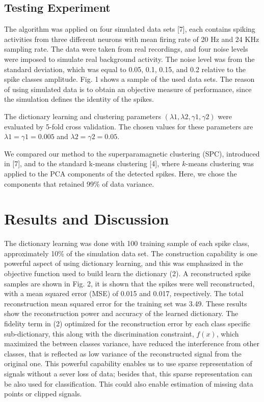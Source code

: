 \documentclass[conference]{IEEEtran}
\begin{document}
	\subsection{Testing Experiment}
	The algorithm was applied on four simulated data sets [7], each contains spiking activities from three different neurons with mean firing rate of 20 Hz and 24 KHz sampling rate. The data were taken from real recordings, and four noise levels were imposed to simulate real background activity. The noise level was from the standard deviation, which was equal to 0.05, 0.1, 0.15, and 0.2 relative to the spike classes amplitude. Fig. 1 shows a sample of the used data sets. The reason of using simulated data is to obtain an objective measure of performance, since the simulation defines the identity of the spikes.
	
	The dictionary learning and clustering parameters
	$(\lambda1, \lambda2, \gamma1, \gamma2)$ were evaluated by 5-fold cross validation. The chosen values for these parameters are $\lambda1 = \gamma1 = 0.005$ and $\lambda2 = \gamma2 = 0.05$.
	
	We compared our method to the superparamagnetic clustering (SPC), introduced in [7], and to the standard k-means clustering [4], where $k$-means clustering was applied to the PCA components of the detected spikes. Here, we chose the components that retained 99\% of data variance.
	
 	\section{Results and Discussion}
	The dictionary learning was done with 100 training sample of each spike class, approximately 10\% of the simulation data set. The construction capability is one powerful aspect of using dictionary learning, and this was emphasized in the objective function used to build learn the dictionary (2). A reconstructed spike samples are shown in Fig. 2, it is shown that the spikes were well reconstructed, with a mean squared error (MSE) of 0.015 and 0.017, respectively. The total reconstruction mean squared error for the training set was 3.49. These results show the reconstruction power and accuracy of the learned dictionary. The fidelity term in (2) optimized for the reconstruction error by each class specific sub-dictionary, this along with the discrimination constraint, $f(x)$, which maximized the between classes variance, have reduced the interference from other classes, that is reflected as low variance of the reconstructed signal from the original one. This powerful capability enables us to use sparse representation of signals without a sever loss of data; besides that, this sparse representation can be also used for classification. This could also enable estimation of missing data points or clipped signals.
	
\end{document}
